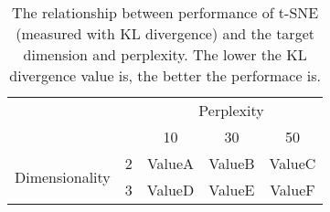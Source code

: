 \begin{table}[htbp] %
\centering
\caption{The relationship between performance of t-SNE (measured with KL divergence) and the target dimension and perplexity. The lower the KL divergence value is, the better the performace is.} %
\label{tab:tsne_performance_comparison} %
\begin{tabular}{@{}llccc@{}} %
\toprule
& & \multicolumn{3}{c}{Perplexity} \\
\cmidrule(lr){3-5} %
& & 10 & 30 & 50 \\
\midrule
\multirow{2}{*}{Dimensionality} & 2 & ValueA & ValueB & ValueC \\ %
& 3 & ValueD & ValueE & ValueF \\ %
\bottomrule
\end{tabular}
\end{table}